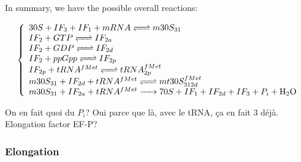 \medskip

In summary, we have the possible overall reactions:
\begin{mdframed}[style=MyFrame]
$$
  \left\{
    \begin{array}{l}
      \reactionRev{30S+IF_3+IF_1+mRNA}{m30S_{31}}{}{} \\
      \reactionRev{IF_2+GTP}{IF_{2a}}{}{} \\
      \reactionRev{IF_2+GDP}{IF_{2d}}{}{} \\
      \reactionRev{IF_2+ppGpp}{IF_{2p}}{}{} \\
      \reactionRev{IF_{2p}+tRNA^{fMet}}{tRNA_{2p}^{fMet}}{}{}{} \\
      \reactionRev{m30S_{31}+IF_{2d}+tRNA^{fMet}}{mt30S_{312d}^{fMet}}{}{}{} \\
      \reactionIrr{m30S_{31}+IF_{2a}+tRNA^{fMet}}{70S+IF_1+IF_{2d}+IF_3+P_i+\ce{H2O}}{}{}{} \\
    \end{array}
  \right.
$$
\end{mdframed}
\textcolor[rgb]{1.00,0.00,0.00}{On en fait quoi du $P_i$? Oui parce que là, avec le tRNA, ça en fait 3 déjà. Elongation factor EF-P?}

\subsubsection{Elongation}
